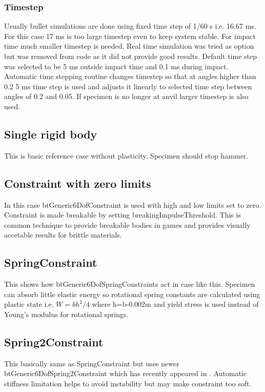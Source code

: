\subsubsection{Timestep}

Usually bullet simulations are done using fixed time step of 1/60 s i.e. 16.67 ms. 
For this case 17 ms is too large timestep even to keep system stable. For impact time much smaller timestep is needed. 
Real time simulation was tried as option but was removed from code as it did not provide good results.  
Default time step was selected to be 5 ms outside impact time and 0.1 ms during impact. 
Automatic time stepping routine changes timestep so that at angles higher than 0.2 5 ms time step is
used and adjusts it linearly to selected time step between angles of 0.2 and 0.05. If specimen is no
longer at anvil larger timestep is also used.

\subsection{Single rigid body}
This is basic reference case without plasticity. Specimen should stop hammer.

\subsection{Constraint with zero limits}
In this case btGeneric6DofConstraint is used with high and low limits set to zero. 
Constraint is made breakable by setting breakingImpulseThreshold.
This is common technique to provide breakable bodies in games and provides visually accetable results for brittle materials.

\subsection{SpringConstraint}
This shows how btGeneric6DofSpringConstraints act in case like this. 
Specimen can absorb little elastic energy so rotational spring constants are calculated using plastic state i.e.
$W=bh^2/4$ where h=b-0.002m and yield stress is used instead of Young’s modulus for rotational springs.

\subsection{Spring2Constraint}
This basically same as SpringConstraint but uses newer btGeneric6DofSpring2Constraint which has recently appeared in
\cbullet. 
Automatic stiffness limitation helps to avoid instability but may make constraint too soft.

